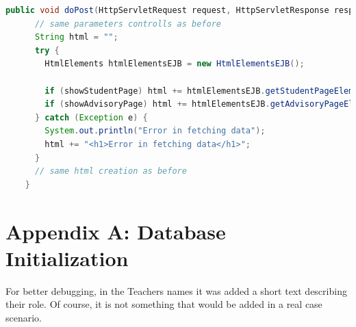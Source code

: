 \documentclass[12pt, a4paper]{article}
\begin{document}
  \begin{lstlisting}[language=java, caption={The new Servlet doPost}]
    public void doPost(HttpServletRequest request, HttpServletResponse response) throws IOException {
      // same parameters controlls as before
      String html = "";
      try {
        HtmlElements htmlElementsEJB = new HtmlElementsEJB();

        if (showStudentPage) html += htmlElementsEJB.getStudentPageElement(matriculation);
        if (showAdvisoryPage) html += htmlElementsEJB.getAdvisoryPageElement(matriculation);
      } catch (Exception e) {
        System.out.println("Error in fetching data");
        html += "<h1>Error in fetching data</h1>";
      }
      // same html creation as before
    }
  \end{lstlisting}

  \pagebreak
  \section{Appendix A: Database Initialization}
  For better debugging, in the Teachers names it was added a short text describing their role. Of course, it is not something that would be added in a real case scenario.
\end{document}
